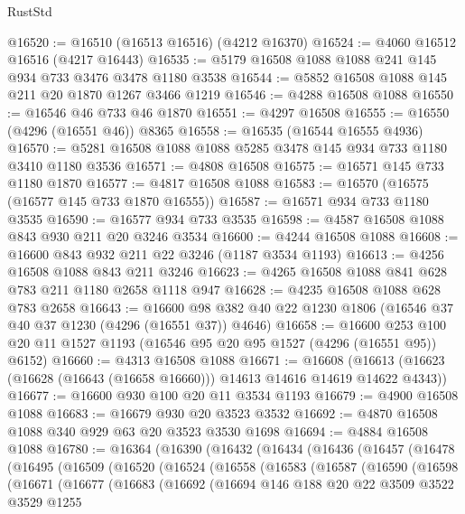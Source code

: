 \begin{lexlean}{RustStd}
\begin{coremodule}
@16520 := @16510 (@16513 @16516) (@4212 @16370)
@16524 := @4060 @16512 @16516 (@4217 @16443)
@16535 := @5179 @16508 @1088 @1088 @241 @145 @934 @733 @3476 @3478 @1180 @3538
@16544 := @5852 @16508 @1088 @145 @211 @20 @1870 @1267 @3466 @1219
@16546 := @4288 @16508 @1088
@16550 := @16546 @46 @733 @46 @1870
@16551 := @4297 @16508
@16555 := @16550 (@4296 (@16551 @46)) @8365
@16558 := @16535 (@16544 @16555 @4936)
@16570 := @5281 @16508 @1088 @1088 @5285 @3478 @145 @934 @733 @1180 @3410 @1180 @3536
@16571 := @4808 @16508
@16575 := @16571 @145 @733 @1180 @1870
@16577 := @4817 @16508 @1088
@16583 := @16570 (@16575 (@16577 @145 @733 @1870 @16555))
@16587 := @16571 @934 @733 @1180 @3535
@16590 := @16577 @934 @733 @3535
@16598 := @4587 @16508 @1088 @843 @930 @211 @20 @3246 @3534
@16600 := @4244 @16508 @1088
@16608 := @16600 @843 @932 @211 @22 @3246 (@1187 @3534 @1193)
@16613 := @4256 @16508 @1088 @843 @211 @3246
@16623 := @4265 @16508 @1088 @841 @628 @783 @211 @1180 @2658 @1118 @947
@16628 := @4235 @16508 @1088 @628 @783 @2658
@16643 := @16600 @98 @382 @40 @22 @1230 @1806 (@16546 @37 @40 @37 @1230 (@4296 (@16551 @37)) @4646)
@16658 := @16600 @253 @100 @20 @11 @1527 @1193 (@16546 @95 @20 @95 @1527 (@4296 (@16551 @95)) @6152)
@16660 := @4313 @16508 @1088
@16671 := @16608
    (@16613 (@16623 (@16628 (@16643 (@16658 @16660))) @14613 @14616 @14619 @14622 @4343))
@16677 := @16600 @930 @100 @20 @11 @3534 @1193
@16679 := @4900 @16508 @1088
@16683 := @16679 @930 @20 @3523 @3532
@16692 := @4870 @16508 @1088 @340 @929 @63 @20 @3523 @3530 @1698
@16694 := @4884 @16508 @1088
@16780 := @16364
    (@16390
      (@16432
        (@16434
          (@16436
            (@16457
              (@16478
                (@16495
                  (@16509
                    (@16520
                      (@16524
                        (@16558
                          (@16583
                            (@16587
                              (@16590
                                (@16598
                                  (@16671
                                    (@16677
                                      (@16683
                                        (@16692
                                          (@16694
                                            @146
                                            @188
                                            @20
                                            @22
                                            @3509
                                            @3522
                                            @3529
                                            @1255

\end{coremodule}
\end{lexlean}
